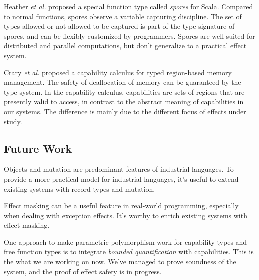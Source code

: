 Heather \emph{et al.} proposed a special function type called
\emph{spores} for Scala\cite{miller2014spores}. Compared to normal
functions, spores observe a variable capturing discipline. The set of
types allowed or not allowed to be captured is part of the type
signature of spores, and can be flexibly customized by
programmers. Spores are well suited for distributed and parallel
computations, but don't generalize to a practical effect system.

Crary \emph{et al.} proposed a capability calculus for typed
region-based memory management\cite{crary1999typed}. The safety of
deallocation of memory can be guaranteed by the type system. In the
capability calculus, capabilities are sets of regions that are
presently valid to access, in contrast to the abstract meaning of
capabilities in our systems. The difference is mainly due to the
different focus of effects under study.

\subsection{Future Work}

Objects and mutation are predominant features of industrial
languages. To provide a more practical model for industrial languages,
it's useful to extend existing systems with record types and mutation.

Effect masking can be a useful feature in real-world programming,
especially when dealing with exception effects. It's worthy to enrich
existing systems with effect masking.

One approach to make parametric polymorphism work for capability types
and free function types is to integrate \emph{bounded quantification}
with capabilities. This is the what we are working on now. We've
managed to prove soundness of the system, and the proof of effect
safety is in progress.


